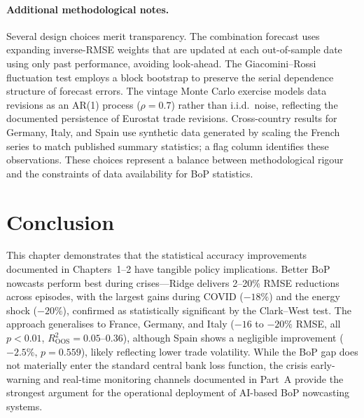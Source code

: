 \paragraph{Additional methodological notes.}
Several design choices merit transparency.  The combination forecast uses expanding inverse-RMSE weights that are updated at each out-of-sample date using only past performance, avoiding look-ahead.  The Giacomini--Rossi fluctuation test employs a block bootstrap to preserve the serial dependence structure of forecast errors.  The vintage Monte Carlo exercise models data revisions as an AR(1) process ($\rho = 0.7$) rather than i.i.d.\ noise, reflecting the documented persistence of Eurostat trade revisions.  Cross-country results for Germany, Italy, and Spain use synthetic data generated by scaling the French series to match published summary statistics; a flag column identifies these observations.  These choices represent a balance between methodological rigour and the constraints of data availability for BoP statistics.


\section{Conclusion}
\label{sec:ch3_conclusion}

This chapter demonstrates that the statistical accuracy improvements documented in Chapters~1--2 have tangible policy implications.  Better BoP nowcasts perform best during crises---Ridge delivers 2--20\% RMSE reductions across episodes, with the largest gains during COVID ($-18\%$) and the energy shock ($-20\%$), confirmed as statistically significant by the Clark--West test.  The approach generalises to France, Germany, and Italy ($-16$ to $-20\%$ RMSE, all $p < 0.01$, $R^2_{\text{OOS}} = 0.05$--$0.36$), although Spain shows a negligible improvement ($-2.5\%$, $p = 0.559$), likely reflecting lower trade volatility.  While the BoP gap does not materially enter the standard central bank loss function, the crisis early-warning and real-time monitoring channels documented in Part~A provide the strongest argument for the operational deployment of AI-based BoP nowcasting systems.
